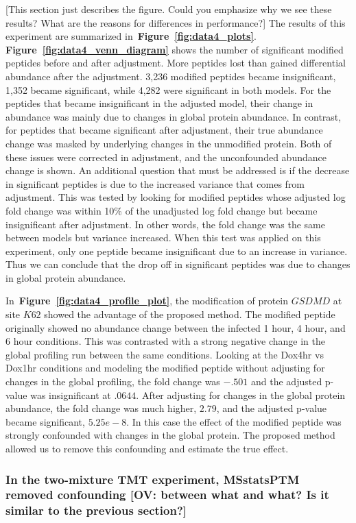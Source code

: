 \documentclass[mcp]{article}
\numberwithin{table}{section}
\def\todo#1{{\color{red}[#1]}}
\def\figref#1{{\bf Figure~\ref{fig:#1}}}
\begin{document}
\todo{This section just describes the figure. Could you emphasize why we see these results? What are the reasons for differences in performance?} The results of this experiment are summarized in~\figref{data4_plots}. \figref{data4_venn_diagram} shows the number of significant modified peptides before and after adjustment. More peptides lost than gained differential abundance after the adjustment. 3,236 modified peptides became insignificant, 1,352 became significant, while 4,282 were significant in both models. For the peptides that became insignificant in the adjusted model, their change in abundance was mainly due to changes in global protein abundance. In contrast, for peptides that became significant after adjustment, their true abundance change was masked by underlying changes in the unmodified protein. Both of these issues were corrected in adjustment, and the unconfounded abundance change is shown. An additional question that must be addressed is if the decrease in significant peptides is due to the increased variance that comes from adjustment. This was tested by looking for modified peptides whose adjusted log fold change was within 10\% of the unadjusted log fold change but became insignificant after adjustment. In other words, the fold change was the same between models but variance increased. When this test was applied on this experiment, only one peptide became insignificant due to an increase in variance. Thus we can conclude that the drop off in significant peptides was due to changes in global protein abundance.

In~\figref{data4_profile_plot}, the modification of protein $GSDMD$ at site $K62$ showed the advantage of the proposed method. The modified peptide originally showed no abundance change between the infected 1 hour, 4 hour, and 6 hour conditions. This was contrasted with a strong negative change in the global profiling run between the same conditions. Looking at the Dox4hr vs Dox1hr conditions and modeling the modified peptide without adjusting for changes in the global profiling, the fold change was $-.501$ and the adjusted p-value was insignificant at $.0644$. After adjusting for changes in the global protein abundance, the fold change was much higher, $2.79$, and the adjusted p-value became significant, $5.25e-8$. In this case the effect of the modified peptide was strongly confounded with changes in the global protein. The proposed method allowed us to remove this confounding and estimate the true effect.

\subsubsection*{In the two-mixture TMT experiment, MSstatsPTM removed confounding \todo{OV: between what and what? Is it similar to the previous section?}}
\end{document}

